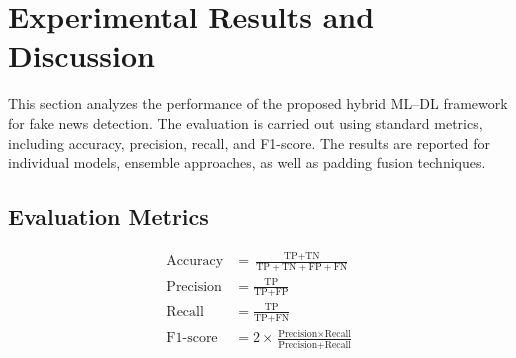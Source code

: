 \documentclass[conference]{IEEEtran}
\begin{document}
\section{Experimental Results and Discussion}
\label{sec:exp}

This section analyzes the performance of the proposed hybrid ML–DL framework for fake news detection. The evaluation is carried out using standard metrics, including accuracy, precision, recall, and F1-score. The results are reported for individual models, ensemble approaches, as well as padding fusion techniques.

\subsection{Evaluation Metrics}
\begin{align}
    \text{Accuracy} &= \frac{\text{TP} + \text{TN}}{\text{TP} + \text{TN} + \text{FP} + \text{FN}} \\
    \text{Precision} &= \frac{\text{TP}}{\text{TP} + \text{FP}} \\
    \text{Recall} &= \frac{\text{TP}}{\text{TP} + \text{FN}} \\
    \text{F1-score} &= 2 \times \frac{\text{Precision} \times \text{Recall}}{\text{Precision} + \text{Recall}}
\end{align}
\end{document}
